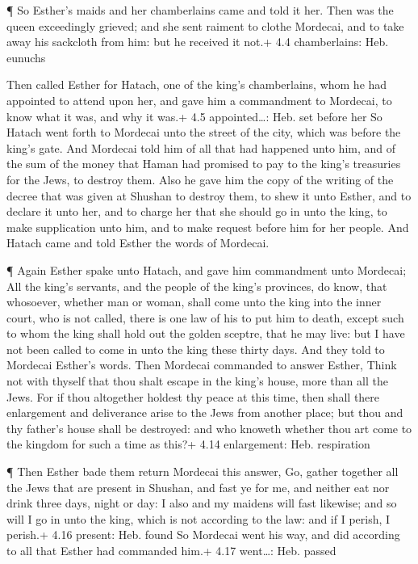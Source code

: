  ¶ So Esther's maids and her chamberlains came and told it
her. Then was the queen exceedingly grieved; and she sent raiment to
clothe Mordecai, and to take away his sackcloth from him: but he
received it not.+ 4.4 chamberlains: Heb. eunuchs

 Then called Esther for Hatach, one of the king's
chamberlains, whom he had appointed to attend upon her, and gave him a
commandment to Mordecai, to know what it was, and why it was.+ 4.5
appointed\ldots: Heb. set before her  So Hatach went forth
to Mordecai unto the street of the city, which was before the king's
gate.  And Mordecai told him of all that had happened unto
him, and of the sum of the money that Haman had promised to pay to the
king's treasuries for the Jews, to destroy them.  Also he
gave him the copy of the writing of the decree that was given at Shushan
to destroy them, to shew it unto Esther, and to declare it unto her, and
to charge her that she should go in unto the king, to make supplication
unto him, and to make request before him for her people. 
And Hatach came and told Esther the words of Mordecai.

 ¶ Again Esther spake unto Hatach, and gave him commandment
unto Mordecai;  All the king's servants, and the people of
the king's provinces, do know, that whosoever, whether man or woman,
shall come unto the king into the inner court, who is not called, there
is one law of his to put him to death, except such to whom the king
shall hold out the golden sceptre, that he may live: but I have not been
called to come in unto the king these thirty days.  And
they told to Mordecai Esther's words.  Then Mordecai
commanded to answer Esther, Think not with thyself that thou shalt
escape in the king's house, more than all the Jews.  For if
thou altogether holdest thy peace at this time, then shall there
enlargement and deliverance arise to the Jews from another place; but
thou and thy father's house shall be destroyed: and who knoweth whether
thou art come to the kingdom for such a time as this?+ 4.14 enlargement:
Heb. respiration

 ¶ Then Esther bade them return Mordecai this answer,
 Go, gather together all the Jews that are present in
Shushan, and fast ye for me, and neither eat nor drink three days, night
or day: I also and my maidens will fast likewise; and so will I go in
unto the king, which is not according to the law: and if I perish, I
perish.+ 4.16 present: Heb. found  So Mordecai went his
way, and did according to all that Esther had commanded him.+ 4.17
went\ldots: Heb. passed

